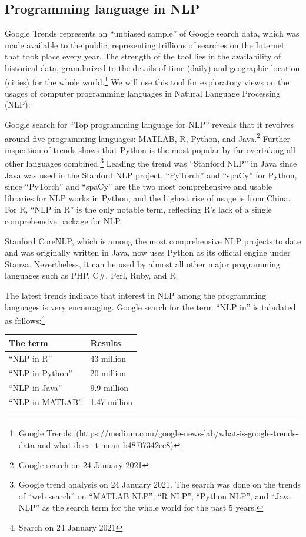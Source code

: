 \documentclass[
]{article}
\begin{document}
\hypertarget{programming-language-in-NLP}{%
\subsection{Programming language in NLP}\label{programming-language-in-NLP}}

Google Trends represents an ``unbiased sample'' of Google search data, which was made available to the public, representing trillions of searches on the Internet that took place every year. The strength of the tool lies in the availability of historical data, granularized to the details of time (daily) and geographic location (cities) for the whole world.\footnote{Google Trends: (\url{https://medium.com/google-news-lab/what-is-google-trends-data-and-what-does-it-mean-b48f07342ee8})} We will use this tool for exploratory views on the usages of computer programming languages in Natural Language Processing (NLP).

Google search for ``Top programming language for NLP'' reveals that it revolves around five programming languages: MATLAB, R, Python, and Java.\footnote{Google search on 24 January 2021} Further inspection of trends shows that Python is the most popular by far overtaking all other languages combined.\footnote{Google trend analysis on 24 January 2021. The search was done on the trends of ``web search'' on ``MATLAB NLP'', ``R NLP'', ``Python NLP'', and ``Java NLP'' as the search term for the whole world for the past 5 years.} Leading the trend was ``Stanford NLP'' in Java since Java was used in the Stanford NLP project, ``PyTorch'' and ``spaCy'' for Python, since ``PyTorch'' and ``spaCy'' are the two most comprehensive and usable libraries for NLP works in Python, and the highest rise of usage is from China. For R, ``NLP in R'' is the only notable term, reflecting R's lack of a single comprehensive package for NLP.

Stanford CoreNLP, which is among the most comprehensive NLP projects to date and was originally written in Java, now uses Python as its official engine under Stanza. Nevertheless, it can be used by almost all other major programming languages such as PHP, C\#, Perl, Ruby, and R.

The latest trends indicate that interest in NLP among the programming languages is very encouraging. Google search for the term ``NLP in'' is tabulated as follows:\footnote{Search on 24 January 2021}

\begin{longtable}[]{@{}ll@{}}
\toprule\noalign{}
The term & Results \\
\midrule\noalign{}
\endhead
\bottomrule\noalign{}
\endlastfoot
``NLP in R'' & 43 million \\
``NLP in Python'' & 20 million \\
``NLP in Java'' & 9.9 million \\
``NLP in MATLAB'' & 1.47 million \\
\end{longtable}
\end{document}
